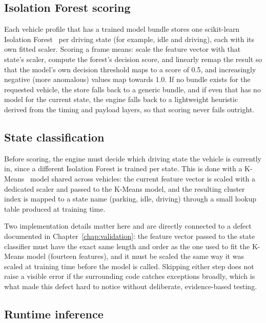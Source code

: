 \subsection{Isolation Forest scoring}

Each vehicle profile that has a trained model bundle stores one scikit-learn~\cite{pedregosa2011scikit} Isolation Forest~\cite{liu2008isolation} per driving state (for example, idle and driving), each with its own fitted scaler. Scoring a frame means: scale the feature vector with that state's scaler, compute the forest's decision score, and linearly remap the result so that the model's own decision threshold maps to a score of 0.5, and increasingly negative (more anomalous) values map towards 1.0. If no bundle exists for the requested vehicle, the store falls back to a generic bundle, and if even that has no model for the current state, the engine falls back to a lightweight heuristic derived from the timing and payload layers, so that scoring never fails outright.

\subsection{State classification}
\label{sec:impl-state}

Before scoring, the engine must decide which driving state the vehicle is currently in, since a different Isolation Forest is trained per state. This is done with a K-Means~\cite{macqueen1967methods} model shared across vehicles: the current feature vector is scaled with a dedicated scaler and passed to the K-Means model, and the resulting cluster index is mapped to a state name (parking, idle, driving) through a small lookup table produced at training time.

Two implementation details matter here and are directly connected to a defect documented in Chapter~\ref{chap:validation}: the feature vector passed to the state classifier must have the exact same length and order as the one used to fit the K-Means model (fourteen features), and it must be scaled the same way it was scaled at training time before the model is called. Skipping either step does not raise a visible error if the surrounding code catches exceptions broadly, which is what made this defect hard to notice without deliberate, evidence-based testing.

\subsection{Runtime inference}

